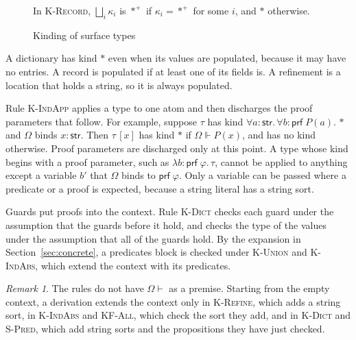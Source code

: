 \documentclass[11pt]{article}
\newcommand{\kw}[1]{\mathsf{#1}}
\newcommand{\str}{\kw{str}}
\newcommand{\prf}[1]{\kw{prf}\;#1}
\newcommand{\letin}[3]{\kw{let}\;#1 = #2\;\kw{in}\;#3}
\newcommand{\proper}{\ast}
\newcommand{\populated}{\ast^{+}}
\newcommand{\kall}[3]{\forall #1 : #2.\,#3}
\newcommand{\iabs}[3]{\lambda #1 : #2.\,#3}
\newcommand{\iapp}[2]{#1\,[#2]}
\newcommand{\proves}{\Vdash}
\newcommand{\discharge}[3]{#1 \vdash #2 \leadsto #3}
\newcommand{\kinding}[4]{#1 \mid #2 \vdash #3 : #4}
\newcommand{\rulename}[1]{\textsc{#1}}
\theoremstyle{remark}
\newtheorem*{remark}{Remark}
\begin{document}
\begin{figure}[!htbp]
In \rulename{K-Record}, $\bigsqcup_i \kappa_i$ is $\populated$ if $\kappa_i = \populated$ for some
$i$, and $\proper$ otherwise.
\caption{Kinding of surface types}
\label{fig:kinding}
\end{figure}

A dictionary has kind $\proper$ even when its values are populated, because it may have no
entries. A record is populated if at least one of its fields is. A refinement is a location that
holds a string, so it is always populated.

Rule \rulename{K-IndApp} applies a type to one atom and then discharges the proof parameters that
follow. For example, suppose $\tau$ has kind
$\kall{a}{\str}{\kall{b}{\prf{P(a)}}{\proper}}$ and $\Omega$ binds $x : \str$. Then $\iapp{\tau}{x}$
has kind $\proper$ if $\Omega \proves P(x)$, and has no kind otherwise. Proof parameters are
discharged only at this point. A type whose kind begins with a proof parameter, such as
$\iabs{b}{\prf{\varphi}}{\tau}$, cannot be applied to anything except a variable $b'$ that $\Omega$
binds to $\prf{\varphi}$. Only a variable can be passed where a predicate or a proof is expected,
because a string literal has a string sort.

Guards put proofs into the context. Rule \rulename{K-Dict} checks each guard under the assumption
that the guards before it hold, and checks the type of the values under the assumption that all of
the guards hold. By the expansion in Section~\ref{sec:concrete}, a predicates block is checked
under \rulename{K-Union} and \rulename{K-IndAbs}, which extend the context with its predicates.

\begin{remark}
The rules do not have $\Omega \vdash$ as a premise. Starting from the empty context, a derivation
extends the context only in \rulename{K-Refine}, which adds a string sort, in \rulename{K-IndAbs}
and \rulename{KF-All}, which check the sort they add, and in \rulename{K-Dict} and
\rulename{S-Pred}, which add string sorts and the propositions they have just checked.
\end{remark}
\end{document}
